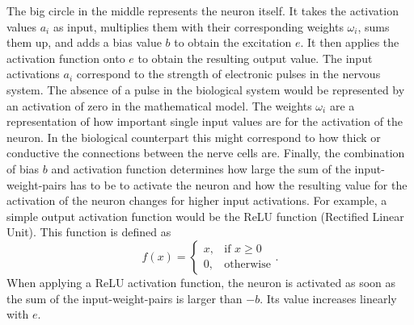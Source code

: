 The big circle in the middle represents the neuron itself. It takes the activation values $a_i$ as input, multiplies them with their corresponding weights $\omega_i$, sums them up, and adds a bias value $b$ to obtain the excitation $e$. It then applies the activation function onto $e$ to obtain the resulting output value. The input activations $a_i$ correspond to the strength of electronic pulses in the nervous system. The absence of a pulse in the biological system would be represented by an activation of zero in the mathematical model. The weights $\omega_i$ are a representation of how important single input values are for the activation of the neuron. In the biological counterpart this might correspond to how thick or conductive the connections between the nerve cells are. Finally, the combination of bias $b$ and activation function determines how large the sum of the input-weight-pairs has to be to activate the neuron and how the resulting value for the activation of the neuron changes for higher input activations. For example, a simple output activation function would be the ReLU function (Rectified Linear Unit).
This function is defined as \cite{ActivationFunctionOverview}
\begin{equation}
	f(x) = 
	\begin{cases}
		x, &\text{if } x\geq0 \\
		0, &\text{otherwise}
	\end{cases}.
\end{equation} 
When applying a ReLU activation function, the neuron is activated as soon as the sum of the input-weight-pairs is larger than $-b$. Its value increases linearly with $e$.

